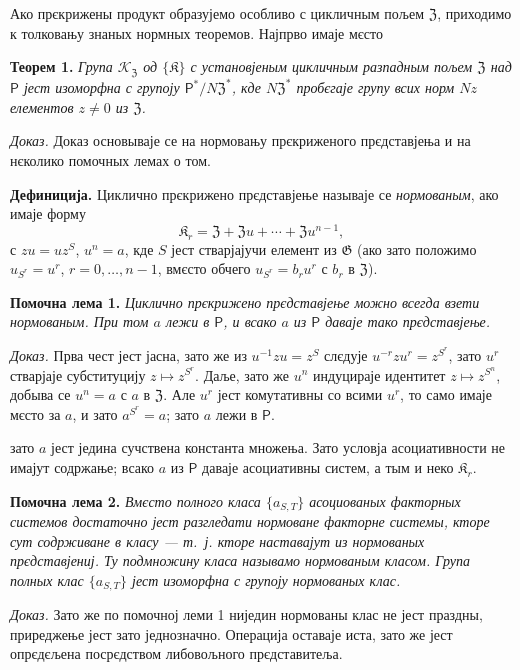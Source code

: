 \documentclass[11pt]{article}
\begin{document}
Ако прєкрижены продукт образујемо особливо с цикличным пољем \(\mathfrak Z\), приходимо к толковању знаных нормных теоремов. Најпрво имаје мєсто

\noindent\textbf{Теорем 1.} \emph{Група \(\mathscr K_{\mathfrak Z}\) од \(\{\mathfrak K\}\) с установјеным цикличным разпадным пољем \(\mathfrak Z\) над \(\mathsf{P}\) јест изоморфна с групоју \(\mathsf{P}^*/N\mathfrak Z^*\), кде \(N\mathfrak Z^*\) пробєгаје групу всих норм \(Nz\) елементов \(z\neq0\) из \(\mathfrak Z\).}

\noindent\emph{Доказ.} Доказ основываје се на нормовању прєкриженого прєдставјења и на нєколико помочных лемах о том.

\noindent\textbf{Дефиниција.} Циклично прєкрижено прєдставјење называје се \emph{нормованым}, ако имаје форму
\[
\mathfrak K_r=\mathfrak Z+\mathfrak Zu+\cdots+\mathfrak Zu^{n-1},
\]
с \(zu=uz^S\), \(u^n=a\), кде \(S\) јест стварјајучи елемент из \(\mathfrak G\) (ако зато положимо \(u_{S^r}=u^r\), \(r=0,\ldots,n-1\), вмєсто обчего \(u_{S^r}=b_ru^r\) с \(b_r\) в \(\mathfrak Z\)).

\noindent\textbf{Помочна лема 1.} \emph{Циклично прєкрижено прєдставјење можно всегда взети нормованым. При том \(a\) лежи в \(\mathsf{P}\), и всако \(a\) из \(\mathsf{P}\) даваје тако прєдставјење.}

\noindent\emph{Доказ.} Прва чест јест јасна, зато же из \(u^{-1}zu=z^S\) слєдује \(u^{-r}zu^r=z^{S^r}\), зато \(u^r\) стварјаје субституцију \(z\mapsto z^{S^r}\). Даље, зато же \(u^n\) индуцираје идентитет \(z\mapsto z^{S^n}\), добыва се \(u^n=a\) с \(a\) в \(\mathfrak Z\). Але \(u^r\) јест комутативны со всими \(u^r\), то само имаје мєсто за \(a\), и зато \(a^{S^r}=a\); зато \(a\) лежи в \(\mathsf{P}\).

зато \(a\) јест једина сучствена константа множења. Зато условја асоциативности не имајут содржање; всако \(a\) из \(\mathsf{P}\) даваје асоциативны систем, а тым и неко \(\mathfrak K_r\).

\noindent\textbf{Помочна лема 2.} \emph{Вмєсто полного класа \(\{a_{S,T}\}\) асоциованых факторных системов достаточно јест разгледати нормоване факторне системы, кторе сут содрживане в класу --- т.~ј. кторе наставајут из нормованых прєдставјениј. Ту подмножину класа называмо нормованым класом. Група полных клас \(\{a_{S,T}\}\) јест изоморфна с групоју нормованых клас.}

\noindent\emph{Доказ.} Зато же по помочној леми 1 ниједин нормованы клас не јест праздны, приреджење јест зато једнозначно. Операција оставаје иста, зато же јест опрєдєљена посрєдством либовољного прєдставитеља.
\end{document}
